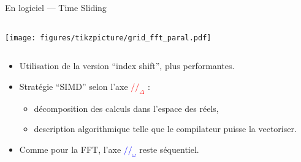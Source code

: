 \documentclass[../main.tex]{subfiles}
\begin{document}
\begin{frame}{En logiciel --- Time Sliding}
  \begin{columns}
    \begin{column}{.4\linewidth} \centering
      \texttt{[image: figures/tikzpicture/grid\_fft\_paral.pdf]}
    \end{column}
  \end{columns}
  \begin{columns}
    \begin{column}{.9\linewidth} \centering
      \begin{itemize}
        \item Utilisation de la version ``index shift'', plus performantes.
        \item Stratégie ``SIMD'' selon l'axe \textcolor{Red}{$//_{\Delta}$} :
              \begin{itemize}
                \item décomposition des calculs dans l'espace des réels,
                \item description algorithmique telle que le compilateur puisse la vectoriser.
              \end{itemize}
        \item Comme pour la FFT, l'axe \textcolor{Blue}{$//_{\omega}$} reste séquentiel.
      \end{itemize}
    \end{column}
  \end{columns}
\end{frame}
\end{document}

